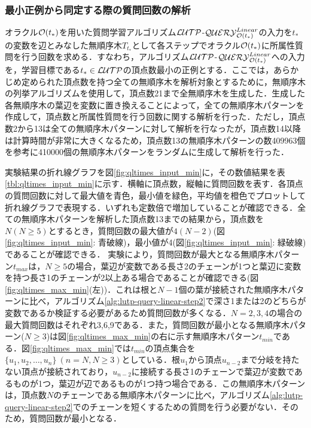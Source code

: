 \subsubsection{最小正例から同定する際の質問回数の解析} \label{qltimes_input_min}
オラクル${\cal O}(t_\ast)$を用いた質問学習アルゴリズム${\cal LUTP}$-${\cal QUERY}_{{\cal O}(t_{\ast})}^{Linear}$の入力を$t_\ast$の変数を辺とみなした無順序木$T_{t_\ast}$として各ステップでオラクル${\cal O}(t_\ast)$に所属性質問を行う回数を求める．すなわち，アルゴリズム${\cal LUTP}$-${\cal QUERY}_{{\cal O}(t_{\ast})}^{Linear}$への入力を，学習目標である$t_\ast\in{\cal LUTP}$の頂点数最小の正例とする．ここでは，あらかじめ定められた頂点数を持つ全ての無順序木を解析対象とするために，無順序木の列挙アルゴリズム\cite{nii-nakano_uno2003,cs-nakano_uno2004}を使用して，頂点数21まで全無順序木を生成した．生成した各無順序木の葉辺を変数に置き換えることによって，全ての無順序木パターンを作成して，頂点数と所属性質問を行う回数に関する解析を行った．ただし，頂点数2から13は全ての無順序木パターンに対して解析を行なったが，頂点数14以降は計算時間が非常に大きくなるため，頂点数13の無順序木パターンの数409963個を参考に410000個の無順序木パターンをランダムに生成して解析を行った．

実験結果の折れ線グラフを図\ref{fig:qltimes_input_min}に，その数値結果を表\ref{tbl:qltimes_input_min}に示す．横軸に頂点数，縦軸に質問回数を表す．各頂点の質問回数に対して最大値を青色，最小値を緑色，平均値を橙色でプロットして折れ線グラフで表現する．いずれも定数倍で増加していることが確認できる．全ての無順序木パターンを解析した頂点数13までの結果から，頂点数を$N(N\geq5)$とするとき，質問回数の最大値が$4(N-2)$(図\ref{fig:qltimes_input_min}: 青破線)，最小値が4(図\ref{fig:qltimes_input_min}: 緑破線)であることが確認できる．
実験により，質問回数が最大となる無順序木パターン$t_{max}$は，$N\geq5$の場合，葉辺が変数である長さ2のチェーンが1つと葉辺に変数を持つ長さ1のチェーンが2以上ある場合であることが確認できる(図\ref{fig:qltimes_max_min}(左))．これは根と$N-1$個の葉が接続された無順序木パターンに比べ，アルゴリズム\ref{alg:lutp-query-linear-step2}で深さ1または2のどちらが変数であるか検証する必要があるため質問回数が多くなる．$N=2,3,4$の場合の最大質問回数はそれぞれ3,6,9である．また，質問回数が最小となる無順序木パターン($N\geq3$)は図\ref{fig:qltimes_max_min}の右に示す無順序木パターン$t_{min}$である．図\ref{fig:qltimes_max_min}では$t_{min}$の頂点集合を$\{u_1,u_2,\ldots,u_n\}~(n=N,N\geq3)$としている．根$u_1$から頂点$u_{n-2}$まで分岐を持たない頂点が接続されており，$u_{n-2}$に接続する長さ1のチェーンで葉辺が変数であるものが1つ，葉辺が辺であるものが1つ持つ場合である．この無順序木パターンは，頂点数$N$のチェーンである無順序木パターンに比べ，アルゴリズム\ref{alg:lutp-query-linear-step2}でのチェーンを短くするための質問を行う必要がない．そのため，質問回数が最小となる．

